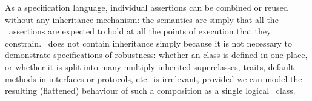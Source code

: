 As a specification language,
individual \Chainmail assertions can be combined or reused without any
inheritance mechanism: the semantics are simply that all
the \Chainmail\ assertions are expected to hold at all the points of
execution that they constrain.  \LangOO\ does not contain inheritance
simply because it is not necessary to demonstrate specifications of
robustness: whether an \LangOO class is defined in one place, or
whether it is split into many multiply-inherited superclasses, traits,
default methods in interfaces or protocols, etc.\ is irrelevant,
provided we can model the resulting (flattened) behaviour of such a
composition as a single logical \LangOO\ class.


%
%
